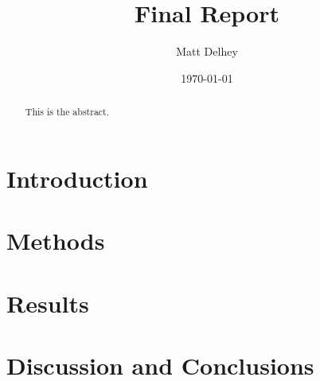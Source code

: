 \documentclass[oneside]{article}
\title{Final Report}
\author{Matt Delhey}
\date{\today}
\begin{document}
\maketitle 

\begin{abstract}
This is the abstract.
\end{abstract}

\section{Introduction}
\section{Methods}
\section{Results}
\section{Discussion and Conclusions}

\end{document}
